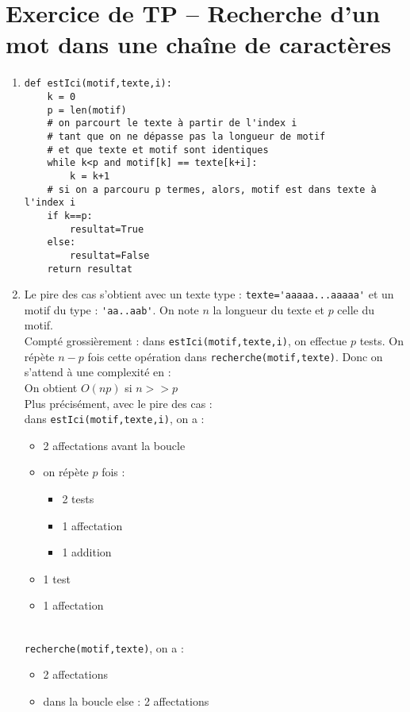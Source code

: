 \section{Exercice de TP -- Recherche d'un mot dans une cha\^ ine de caract\` eres}
\begin{enumerate}
\item \begin{verbatim}
def estIci(motif,texte,i):
    k = 0
    p = len(motif)
    # on parcourt le texte à partir de l'index i 
    # tant que on ne dépasse pas la longueur de motif 
    # et que texte et motif sont identiques
    while k<p and motif[k] == texte[k+i]:
        k = k+1
    # si on a parcouru p termes, alors, motif est dans texte à l'index i
    if k==p:
        resultat=True
    else:
        resultat=False    	
    return resultat                
\end{verbatim}
\item Le pire des cas s'obtient avec un texte type : \verb?texte='aaaaa...aaaaa'? et un motif du type : \verb?'aa..aab'?. On note $n$ la longueur du texte et $p$ celle du motif.\\
Compté grossièrement : dans \verb?estIci(motif,texte,i)?, on effectue $p$ tests. On répète $n-p$ fois cette opération dans \verb?recherche(motif,texte)?. Donc on s'attend à une complexité en :  \\
On obtient $O(np)$ si $n>>p$\bigskip \\
Plus précisément, avec le pire des cas :\\
dans \verb?estIci(motif,texte,i)?, on a :
\begin{itemize}
\item 2 affectations avant la boucle
\item on répète $p$ fois :
\begin{itemize}
\item 2 tests
\item 1 affectation
\item 1 addition
\end{itemize}
\item 1 test
\item 1 affectation
\end{itemize}
\\
 \verb?recherche(motif,texte)?, on a :
 \begin{itemize}
 \item 2 affectations
 \item dans la boucle else : 2 affectations

\end{itemize}
\end{enumerate}
